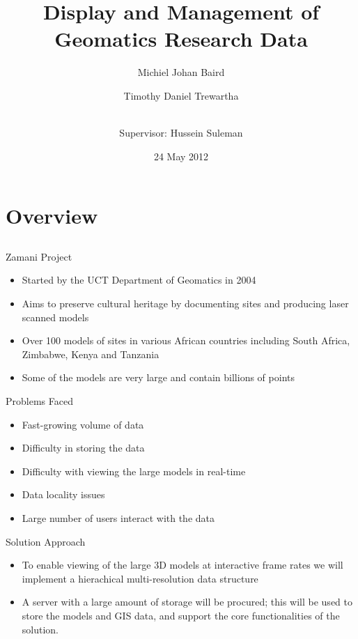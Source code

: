 \documentclass{beamer}
\title[Display and Management]{Display and Management of Geomatics Research Data}
\author{Michiel Johan Baird \and
    Timothy Daniel Trewartha \and
   \\  Supervisor: Hussein Suleman}
\date{24 May 2012}
\begin{document}
\begin{frame}
    \titlepage
\end{frame}

\section{Overview}
\subsection{}
\begin{frame}{Zamani Project}

\begin{itemize}
    \item Started by the UCT Department of Geomatics in 2004
    \item Aims to preserve cultural heritage by documenting sites
      and producing laser scanned models
    \item Over 100 models of sites in various African countries including
      South Africa, Zimbabwe, Kenya and Tanzania
    \item Some of the models are very large and contain billions of points
\end{itemize}


\end{frame}

\begin{frame}{Problems Faced}


\begin{itemize}
    \item Fast-growing volume of data
    \item Difficulty in storing the data
    \item Difficulty with viewing the large models in real-time
    \item Data locality issues
    \item Large number of users interact with the data
\end{itemize}

\end{frame}

\begin{frame}{Solution Approach}

\begin{itemize}
\item To enable viewing of the large 3D models at interactive frame
  rates we will implement a hierachical multi-resolution data
  structure
\item A server with a large amount of storage will be procured; this will
  be used to store the models and GIS data, and support the core
  functionalities of the solution.
    \end{itemize}
\end{frame}
\end{document}

